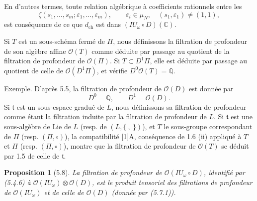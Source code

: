 \documentclass[10pt,a4paper]{article}
\newcommand{\Q}{\mathbb Q}
\newcommand{\OO}{\mathcal O}
\newcommand{\C}{\mathbb C}
\theoremstyle{deligne}
\newtheorem*{proposition*}{Proposition}
\newcommand{\heading}[1]{\vspace{0.65em}\noindent{\bfseries #1}\quad}
\begin{document}
En d'autres termes, toute relation algébrique à coefficients rationnels entre les
\[
\zeta(s_1,\ldots,s_m;\varepsilon_1,\ldots,\varepsilon_m),\qquad
\varepsilon_i\in\mu_N,\quad (s_1,\varepsilon_1)\ne(1,1),
\]
est conséquence de ce que \(d_{\mathrm{ch}}\) est dans \((IU_\omega\circ D)(\C)\).

\heading{5.7.} Si \(T\) est un sous-schéma fermé de \(\Pi\), nous définissons la filtration de profondeur de son algèbre affine \(\OO(T)\) comme déduite par passage au quotient de la filtration de profondeur de \(\OO(\Pi)\). Si \(T\subset D^1\Pi\), elle est déduite par passage au quotient de celle de \(\OO(D^1\Pi)\), et vérifie \(D^0\OO(T)=\Q\).

Exemple. D'après 5.5, la filtration de profondeur de \(\OO(D)\) est donnée par
\[
\tag{5.7.1}
D^0=\Q,\qquad D^1=\OO(D).
\]
Si \(\mathfrak t\) est un sous-espace gradué de \(L\), nous définissons sa filtration de profondeur comme étant la filtration induite par la filtration de profondeur de \(L\). Si \(\mathfrak t\) est une sous-algèbre de Lie de \(L\) (resp. de \((L,\{\ ,\ \})\)), et \(T\) le sous-groupe correspondant de \(\Pi\) (resp. \((\Pi,\circ)\)), la compatibilité [1]A, conséquence de 1.6 (ii) appliqué à \(T\) et \(\Pi\) (resp. \((\Pi,\circ)\)), montre que la filtration de profondeur de \(\OO(T)\) se déduit par 1.5 de celle de \(\mathfrak t\).

\begin{proposition*}[5.8]
La filtration de profondeur de \(\OO(IU_\omega\circ D)\), identifié par (5.4.6) à \(\OO(IU_\omega)\otimes\OO(D)\), est le produit tensoriel des filtrations de profondeur de \(\OO(IU_\omega)\) et de celle de \(\OO(D)\) (donnée par (5.7.1)).
\end{proposition*}
\end{document}

